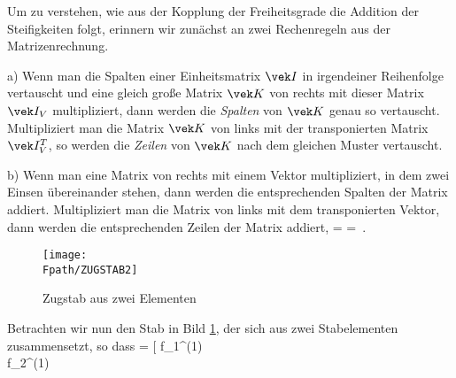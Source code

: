 Um zu verstehen, wie aus der Kopplung der Freiheitsgrade die Addition der Steifigkeiten
folgt, erinnern wir zun\"{a}chst an zwei Rechenregeln aus der Matrizenrechnung.

a) Wenn man die Spalten einer Einheitsmatrix $\vek I$ in irgendeiner Reihenfolge
vertauscht und eine gleich gro{\ss}e Matrix $\vek K$ von rechts mit dieser Matrix $\vek I_V$
multipliziert, dann werden die {\em Spalten\/} von $\vek K$ genau so vertauscht.
Multipliziert man die Matrix $\vek K$ von links mit der transponierten Matrix $\vek
I^T_V$, so werden die {\em Zeilen\/} von $\vek K$ nach dem gleichen Muster vertauscht.

b) Wenn man eine Matrix von rechts mit einem Vektor multipliziert, in dem zwei Einsen
\"{u}bereinander stehen, dann werden die entsprechenden Spalten der Matrix addiert.
Multipliziert man die Matrix von links mit dem transponierten Vektor, dann werden die
entsprechenden Zeilen der Matrix addiert,
\bfoo
{}  = \qquad {}  =
\,.
\efoo
\begin{figure}[tbp]
\if {} \sidecaption \fi
\texttt{[image: \\Fpath/ZUGSTAB2]}
\caption{Zugstab aus zwei Elementen} \label{Zugstab2}
\end{figure}%
Betrachten wir nun den Stab in Bild \ref{Zugstab2}, der sich aus zwei Stabelementen
zusammensetzt, so dass
\bfoo
{}  = \left [  f_1^{(1)} \\ f_2^{(1)}

